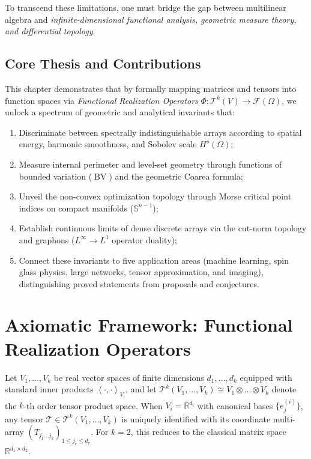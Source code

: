 \documentclass[11pt,a4paper,reqno]{amsart}
\theoremstyle{definition}
\numberwithin{equation}{section}
\providecommand{\R}{\mathbb{R}}
\providecommand{\Sph}{\mathbb{S}}
\providecommand{\BV}{\operatorname{BV}}
\newcommand{\inner}[2]{\left\langle #1, #2 \right\rangle}
\begin{document}
To transcend these limitations, one must bridge the gap between multilinear algebra and \emph{infinite-dimensional functional analysis, geometric measure theory, and differential topology}. 

\subsection*{Core Thesis and Contributions}
This chapter demonstrates that by formally mapping matrices and tensors into function spaces via \emph{Functional Realization Operators} $\Phi \colon \mathcal{T}^k(V) \to \mathcal{F}(\Omega)$, we unlock a spectrum of geometric and analytical invariants that:
\begin{enumerate}[label=\arabic*.]
    \item Discriminate between spectrally indistinguishable arrays according to spatial energy, harmonic smoothness, and Sobolev scale $H^s(\Omega)$;
    \item Measure internal perimeter and level-set geometry through functions of bounded variation ($\BV$) and the geometric Coarea formula;
    \item Unveil the non-convex optimization topology through Morse critical point indices on compact manifolds ($\Sph^{n-1}$);
    \item Establish continuous limits of dense discrete arrays via the cut-norm topology and graphons ($L^\infty \to L^1$ operator duality);
    \item Connect these invariants to five application areas (machine learning, spin glass physics, large networks, tensor approximation, and imaging), distinguishing proved statements from proposals and conjectures.
\end{enumerate}

\section{Axiomatic Framework: Functional Realization Operators}
\label{sec:framework}

Let $V_1, \dots, V_k$ be real vector spaces of finite dimensions $d_1, \dots, d_k$ equipped with standard inner products $\inner{\cdot}{\cdot}_{V_i}$, and let $\mathcal{T}^k(V_1, \dots, V_k) \cong V_1 \otimes \dots \otimes V_k$ denote the $k$-th order tensor product space. When $V_i = \R^{d_i}$ with canonical bases $\{e_{j}^{(i)}\}$, any tensor $\mathcal{T} \in \mathcal{T}^k(V_1, \dots, V_k)$ is uniquely identified with its coordinate multi-array $(T_{j_1 \dots j_k})_{1 \le j_r \le d_r}$. For $k=2$, this reduces to the classical matrix space $\R^{d_1 \times d_2}$.
\end{document}
